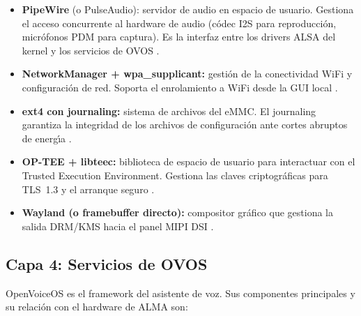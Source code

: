 \begin{itemize}
  \item \textbf{PipeWire} (o PulseAudio): servidor de audio en espacio de usuario.
    Gestiona el acceso concurrente al hardware de audio (c\'{o}dec I2S para
    reproducci\'{o}n, micr\'{o}fonos PDM para captura). Es la interfaz entre
    los drivers ALSA del kernel y los servicios de OVOS .
  \item \textbf{NetworkManager + wpa\_supplicant:} gesti\'{o}n de la conectividad
    WiFi y configuraci\'{o}n de red. Soporta el enrolamiento a WiFi desde la GUI
    local .
  \item \textbf{ext4 con journaling:} sistema de archivos del eMMC. El journaling
    garantiza la integridad de los archivos de configuraci\'{o}n ante cortes
    abruptos de energ\'{\i}a .
  \item \textbf{OP-TEE + libteec:} biblioteca de espacio de usuario para
    interactuar con el Trusted Execution Environment. Gestiona las claves
    criptogr\'{a}ficas para TLS~1.3 y el arranque seguro .
  \item \textbf{Wayland (o framebuffer directo):} compositor gr\'{a}fico que
    gestiona la salida DRM/KMS hacia el panel MIPI DSI .
\end{itemize}

\subsection{Capa 4: Servicios de OVOS}

OpenVoiceOS es el framework del asistente de voz. Sus componentes principales
y su relaci\'{o}n con el hardware de ALMA son:

